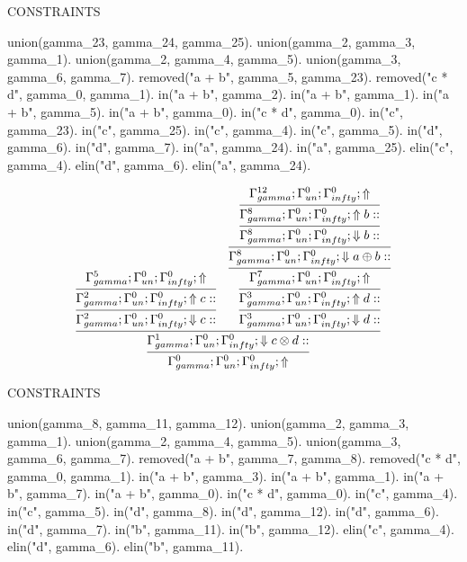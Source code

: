 \documentclass[a4paper, 11pt]{article}
\begin{document}
CONSTRAINTS 

union(gamma\_23, gamma\_24, gamma\_25).
union(gamma\_2, gamma\_3, gamma\_1).
union(gamma\_2, gamma\_4, gamma\_5).
union(gamma\_3, gamma\_6, gamma\_7).
removed("a + b", gamma\_5, gamma\_23).
removed("c * d", gamma\_0, gamma\_1).
in("a + b", gamma\_2).
in("a + b", gamma\_1).
in("a + b", gamma\_5).
in("a + b", gamma\_0).
in("c * d", gamma\_0).
in("c", gamma\_23).
in("c", gamma\_25).
in("c", gamma\_4).
in("c", gamma\_5).
in("d", gamma\_6).
in("d", gamma\_7).
in("a", gamma\_24).
in("a", gamma\_25).
elin("c", gamma\_4).
elin("d", gamma\_6).
elin("a", gamma\_24).

\[
\infer{\Gamma_{ gamma}^{0} ; \Gamma_{un}^{0} ; \Gamma_{ infty}^{0} ;  \Uparrow }
{\infer{\Gamma_{ gamma}^{1} ; \Gamma_{un}^{0} ; \Gamma_{ infty}^{0} ;  \Downarrow c \otimes d :: }
{\infer{\Gamma_{ gamma}^{2} ; \Gamma_{un}^{0} ; \Gamma_{ infty}^{0} ;  \Downarrow c :: }
{\infer{\Gamma_{ gamma}^{2} ; \Gamma_{un}^{0} ; \Gamma_{ infty}^{0} ;  \Uparrow c :: }
{\Gamma_{ gamma}^{5} ; \Gamma_{un}^{0} ; \Gamma_{ infty}^{0} ;  \Uparrow }}
&
\infer{\Gamma_{ gamma}^{3} ; \Gamma_{un}^{0} ; \Gamma_{ infty}^{0} ;  \Downarrow d :: }
{\infer{\Gamma_{ gamma}^{3} ; \Gamma_{un}^{0} ; \Gamma_{ infty}^{0} ;  \Uparrow d :: }
{\infer{\Gamma_{ gamma}^{7} ; \Gamma_{un}^{0} ; \Gamma_{ infty}^{0} ;  \Uparrow }
{\infer{\Gamma_{ gamma}^{8} ; \Gamma_{un}^{0} ; \Gamma_{ infty}^{0} ;  \Downarrow a \oplus b :: }
{\infer{\Gamma_{ gamma}^{8} ; \Gamma_{un}^{0} ; \Gamma_{ infty}^{0} ;  \Downarrow b :: }
{\infer{\Gamma_{ gamma}^{8} ; \Gamma_{un}^{0} ; \Gamma_{ infty}^{0} ;  \Uparrow b :: }
{\Gamma_{ gamma}^{12} ; \Gamma_{un}^{0} ; \Gamma_{ infty}^{0} ;  \Uparrow }}}}}}}}
\]
 
CONSTRAINTS 

union(gamma\_8, gamma\_11, gamma\_12).
union(gamma\_2, gamma\_3, gamma\_1).
union(gamma\_2, gamma\_4, gamma\_5).
union(gamma\_3, gamma\_6, gamma\_7).
removed("a + b", gamma\_7, gamma\_8).
removed("c * d", gamma\_0, gamma\_1).
in("a + b", gamma\_3).
in("a + b", gamma\_1).
in("a + b", gamma\_7).
in("a + b", gamma\_0).
in("c * d", gamma\_0).
in("c", gamma\_4).
in("c", gamma\_5).
in("d", gamma\_8).
in("d", gamma\_12).
in("d", gamma\_6).
in("d", gamma\_7).
in("b", gamma\_11).
in("b", gamma\_12).
elin("c", gamma\_4).
elin("d", gamma\_6).
elin("b", gamma\_11).
\end{document}

